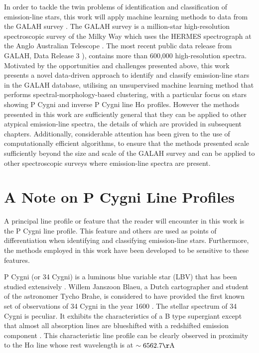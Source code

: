 In order to tackle the twin problems of identification and classification of emission-line stars, this work will apply machine learning methods to data from the GALAH survey \citep{buder2021galah+}. The GALAH survey is a million-star high-resolution spectroscopic survey of the Milky Way which uses the HERMES spectrograph at the Anglo Australian Telescope \citep{de2015galah}. The most recent public data release from GALAH, Data Release 3 \citep[DR3;][]{buder2021galah+}), contains more than 600,000 high-resolution spectra. Motivated by the opportunities and challenges presented above, this work presents a novel data-driven approach to identify and classify emission-line stars in the GALAH database, utilising an unsupervised machine learning method that performs spectral-morphology-based clustering, with a particular focus on stars showing P Cygni and inverse P Cygni line H$\alpha$ profiles. However the methods presented in this work are sufficiently general that they can be applied to other atypical emission-line spectra, the details of which are provided in subsequent chapters. Additionally, considerable attention has been given to the use of computationally efficient algorithms, to ensure that the methods presented scale sufficiently beyond the size and scale of the GALAH survey and can be applied to other spectroscopic surveys where emission-line spectra are present. 

\section{A Note on P Cygni Line Profiles}

A principal line profile or feature that the reader will encounter in this work is the P Cygni line profile. This feature and others are used as points of differentiation when identifying and classifying emission-line stars. Furthermore, the methods employed in this work have been developed to be sensitive to these features.

P Cygni (or 34 Cygni) is a luminous blue variable star (LBV) that has been studied extensively \citep{1953PDAO....9....1B, hutchings1969expanding, elliott20225, underhill1966supergiants, mizumoto2018newly}. Willem Janszoon Blaeu, a Dutch cartographer and student of the astronomer Tycho Brahe, is considered to have provided the first known set of observations of 34 Cygni in the year 1600 \citep{de2001p}. The stellar spectrum of 34 Cygni is peculiar. It exhibits the characteristics of a B type supergiant except that almost all absorption lines are blueshifted with a redshifted emission component \citep{hutchings1969expanding}. This characteristic line profile can be clearly observed in proximity to the H$\alpha$ line whose rest wavelength is at $\sim 6562.7 {\rm \AA}$ \citep{zhang2021catalog, traven2015gaia}

